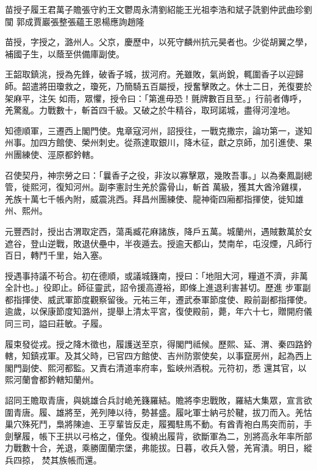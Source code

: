 
\begin{pinyinscope}

 苗授子履王君萬子贍張守約王文鬱周永清劉紹能王光祖李浩和斌子詵劉仲武曲珍劉闃
 郭成賈巖張整張蘊王恩楊應詢趙隆



 苗授，字授之，潞州人。父京，慶歷中，以死守麟州抗元昊者也。少從胡翼之學，補國子生，以蔭至供備庫副使。



 王韶取鎮洮，授為先鋒，破香子城，拔河府。羌雖敗，氣尚銳，輒圍香子以迎歸師。韶遣將田瓊救之，瓊死，乃簡騎五百屬授，授奮擊敗之。休士二日，羌復要於架麻平，注矢
 如雨，眾懼，授令曰：「第進毋恐！氈牌數百且至。」行前者傳呼，羌驚亂。力戰數十，斬首四千級。又破之於牛精谷，取珂諾城，盡得河湟地。



 知德順軍，三遷西上閣門使。鬼章寇河州，詔授往，一戰克撒宗，論功第一，遂知州事。加四方館使、榮州刺史。從燕達取銀川，降木征，獻之京師，加引進使、果州團練使、涇原都鈐轄。



 召使契丹，神宗勞之曰：「曩香子之役，非汝以寡擊眾，幾敗吾事。」以為秦鳳副總管，徙熙河，復知河州。副李憲討生羌於露骨山，斬首
 萬級，獲其大酋泠雞樸，羌族十萬七千帳內附，威震洮西。拜昌州團練使、龍神衛四廂都指揮使，徙知雄州、熙州。



 元豐西討，授出古渭取定西，蕩禹臧花麻諸族，降戶五萬。城蘭州，遇賊數萬於女遮谷，登山逆戰，敗退伏壘中，半夜遁去。授逾天都山，焚南牟，屯沒煙，凡師行百日，轉鬥千里，始入塞。



 授遇事持議不茍合。初在德順，或議城籛南，授曰：「地阻大河，糧道不濟，非萬全計也。」役即止。師征靈武，詔令援高遵裕，即條上進退利害甚切。歷進
 步軍副都指揮使、威武軍節度觀察留後。元祐三年，遷武泰軍節度使、殿前副都指揮使。逾歲，以保康節度知潞州，提舉上清太平宮，復使殿前，薨，年六十七，贈開府儀同三司，謚曰莊敏。子履。



 履束發從戎。授之降木徵也，履護送至京，得閣門祗候。歷熙、延、渭、秦四路鈐轄，知鎮戎軍。及其父時，已官四方館使、吉州防禦使矣，以事竄房州，起為西上閣門副使、熙河都監。又責右清道率府率，監峽州酒稅。元符初，悉
 還其官，以熙河蘭會都鈐轄知蘭州。



 詔同王贍取青唐，與姚雄合兵討峗羌籛羅結。贍將李忠戰敗，羅結大集眾，宣言欲圍青唐。履、雄將至，羌列陣以待，勢甚盛。履叱軍士納弓於鞬，拔刀而入。羌怙巢穴殊死鬥，梟將陳迪、王亨輩皆反走，履獨駐馬不動。有酋青袍白馬突而前，手劍擊履，帳下王拱以弓格之，僅免。復繞出履背，欲斷軍為二，別將高永年率所部力戰數十合，羌退，乘勝圍蘭宗堡，弗能拔。日暮，收兵入營，羌宵潰。明日，縱兵四掠，
 焚其族帳而還。




\end{pinyinscope}
